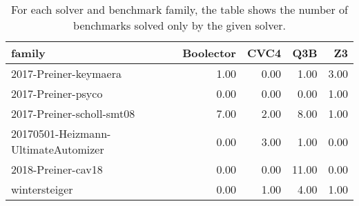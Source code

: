 \begin{table}[tbp]
\centering
\begin{tabular}{lrrrr}
  \toprule
family & Boolector & CVC4 & Q3B & Z3 \\ 
  \midrule
2017-Preiner-keymaera & 1.00 & 0.00 & 1.00 & 3.00 \\ 
  2017-Preiner-psyco & 0.00 & 0.00 & 0.00 & 1.00 \\ 
  2017-Preiner-scholl-smt08 & 7.00 & 2.00 & 8.00 & 1.00 \\ 
  20170501-Heizmann-UltimateAutomizer & 0.00 & 3.00 & 1.00 & 0.00 \\ 
  2018-Preiner-cav18 & 0.00 & 0.00 & 11.00 & 0.00 \\ 
  wintersteiger & 0.00 & 1.00 & 4.00 & 1.00 \\ 
   \bottomrule
\end{tabular}
\caption{For each solver and benchmark family, the table shows the number of benchmarks solved only by the given solver.} 
\label{tbl:uniquelySolved}
\end{table}
